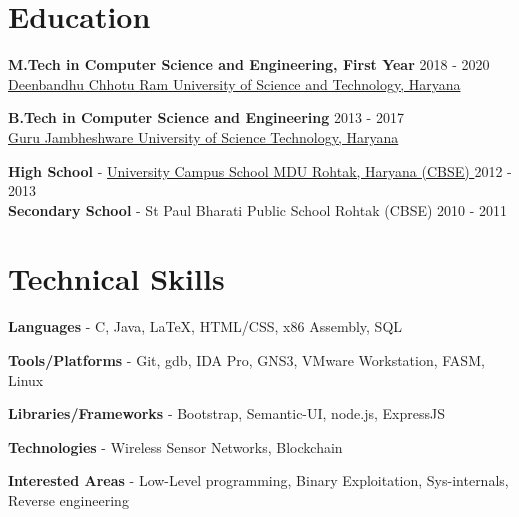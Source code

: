\documentclass[margin, centered]{res}
\begin{document}
\begin{resume}

\section{Education}

\textbf{M.Tech in Computer Science and Engineering, First Year} \hfill 2018 - 2020 \\
\href{http://dcrustm.ac.in//}{Deenbandhu Chhotu Ram University of Science and Technology, Haryana}

\textbf{B.Tech in Computer Science and Engineering} \hfill 2013 - 2017 \\
\href{http://www.gjust.ac.in/}{Guru Jambheshware University of Science Technology, Haryana}

\textbf{High School} - \href{http://www.mdurohtak.ac.in/info/campusschool.html/} {University Campus School MDU Rohtak, Haryana (CBSE) } \hfill 2012 - 2013 \\
\textbf{Secondary School} - St Paul Bharati Public School Rohtak (CBSE)  \hfill 2010 - 2011 \\
\vspace{3mm}
\section{Technical \hspace{2mm} Skills}

\textbf{Languages} - C, Java, \LaTeX, HTML/CSS, x86 Assembly, SQL

\textbf{Tools/Platforms} - Git, gdb, IDA Pro, GNS3, VMware Workstation, FASM, Linux

\textbf{Libraries/Frameworks} - Bootstrap, Semantic-UI, node.js, ExpressJS

\textbf{Technologies} - Wireless Sensor Networks, Blockchain

\textbf{Interested Areas} - Low-Level programming, Binary Exploitation, Sys-internals, Reverse engineering 
\vspace{4mm}



\end{resume}
\end{document}
